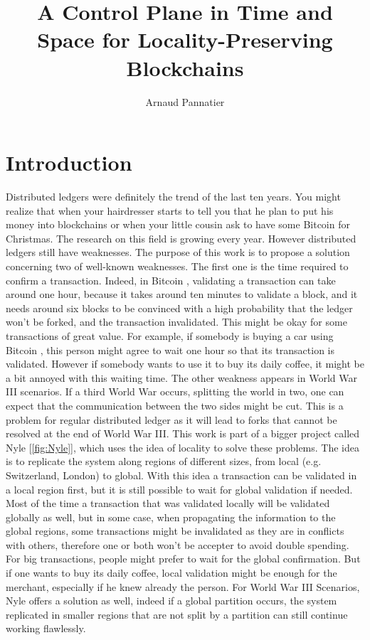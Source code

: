 \documentclass[a4paper,11pt,oneside]{report}
\title{A Control Plane in Time and Space for Locality-Preserving Blockchains}
\author{Arnaud Pannatier}
\begin{document}
\maketitle 

\maketoc

\chapter{Introduction} %

Distributed ledgers were definitely the trend of the last ten years. You might realize that when your hairdresser starts to tell you that he plan to put his money into blockchains or when your little cousin ask to have some Bitcoin \cite{Nakamoto2009} for Christmas. The research on this field is growing every year.  However distributed ledgers still have weaknesses. The purpose of this work is to propose a solution concerning two
of well-known weaknesses. The first one is the time required to confirm a transaction. 
Indeed, in Bitcoin \cite{Nakamoto2009}, validating a transaction can take around one
hour, because it takes around ten minutes to validate a block, and it needs
around six blocks to be convinced with a high probability that the ledger won't
be forked, and the transaction invalidated. This might be okay for some
transactions of great value. For example, if somebody is buying a car using
Bitcoin  \cite{Nakamoto2009}, this person might agree to wait one hour so that its transaction is
validated. However if somebody wants to use it to buy its daily coffee, it
might be a bit annoyed with this waiting time. The other weakness appears in World War
III scenarios. If a third World War occurs, splitting the world in two, one can
expect that the communication between the two sides might be cut. This is a
problem for regular distributed ledger as it will lead to forks that cannot be
resolved at the end of  World War III.  This work is part of a bigger project called Nyle
[\autoref{fig:Nyle}], which uses the idea of locality to solve these problems.
The idea is to replicate the system along regions of different sizes, from
local (e.g.  Switzerland, London) to global. With this idea a transaction can
be validated in a local region first, but it is still possible to wait for global
validation if needed. Most of the time a transaction that was validated locally will be
validated globally as well, but in some case, when propagating the information
to the global regions, some transactions might be invalidated as they are in conflicts with others, therefore one or both won't be accepter to avoid double
spending. For big transactions, people might prefer to wait for the global
confirmation. But if one wants to buy its daily coffee, local validation might
be enough for the merchant, especially if he knew already the person. For
World War III Scenarios, Nyle offers a solution as well, indeed if a global
partition occurs, the system replicated in smaller regions that are not split
by a partition can still continue working flawlessly. 
\end{document}
